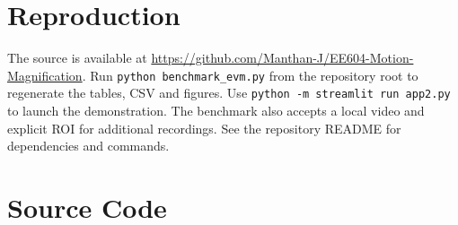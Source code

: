 \documentclass[10pt,twocolumn,letterpaper]{article}
\newcommand{\codefile}[1]{}
\begin{document}
\clearpage

\appendix
\section{Reproduction}
The source is available at
\url{https://github.com/Manthan-J/EE604-Motion-Magnification}.
Run \texttt{python benchmark\_evm.py} from the repository root to regenerate
the tables, CSV and figures. Use \texttt{python -m streamlit run app2.py}
to launch the demonstration. The benchmark also accepts a local video
and explicit ROI for additional recordings. See the repository README
for dependencies and commands.

\section{Source Code}
\codefile{src/spatial.py}
\codefile{auto_frequency.py}
\codefile{auto_roi.py}
\codefile{roi_magnification.py}
\codefile{app2.py}
\codefile{benchmark_evm.py}
\end{document}
